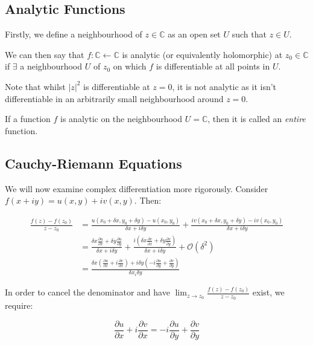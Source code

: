 \documentclass{../../physics_notes}
\begin{document}
\subsection{Analytic Functions}
Firstly, we define a neighbourhood of $z\in \mathbb{C}$ as an open set $U$ such that $z \in U$.

We can then say that $f: \mathbb{C} \leftarrow \mathbb{C}$ is analytic (or equivalently holomorphic) at $z_0 \in \mathbb{C}$ if $\exists$ a neighbourhood $U$ of $z_0$ on which $f$ is differentiable at all points in $U$.

Note that whilst $|z|^2$ is differentiable at $z = 0$, it is not analytic as it isn't differentiable in an arbitrarily small neighbourhood around $z=0$.

If a function $f$ is analytic on the neighbourhood $U = \mathbb{C}$, then it is called an \emph{entire} function.

\subsection{Cauchy-Riemann Equations }
We will now examine complex differentiation more rigorously. Consider $f(x + iy) = u(x,y) + iv(x,y)$. Then:

\begin{align*}
\frac{f(z) - f(z_0)}{z-z_0} &= \frac{u(x_0 + \delta x, y_0 + \delta y) -u(x_0, y_0)}{\delta x + i\delta y} + \frac{iv(x_0 + \delta x, y_0 + \delta y) - iv(x_0,y_0)}{\delta x + i\delta y} \\
&= \frac{\delta x \frac{\partial u}{\partial x} + \delta y \frac{\partial u}{\partial y}}{\delta x + i\delta y} + \frac{i \left(\delta x \frac{\partial v}{\partial x} + \delta y \frac{\partial v}{\partial y} \right)}{\delta x + i\delta y} + \mathcal{O}(\delta^2) \\
&= \frac{\delta x \left(\frac{\partial u}{\partial x} + i\frac{\partial v}{\partial x}\right) + i\delta y \left(-i\frac{\partial u}{\partial y} + \frac{\partial v}{\partial y}\right)}{\delta x _ i\delta y}
\end{align*}

In order to cancel the denominator and have $\lim_{z\to z_0} \frac{f(z) - f(z_0)}{z-z_0}$ exist, we require:

\[ \frac{\partial u}{\partial x} + i\frac{\partial v}{\partial x} = -i\frac{\partial u}{\partial y} + \frac{\partial v}{\partial y} \]
\end{document}
